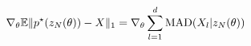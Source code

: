 \documentclass[preview]{standalone}
\begin{document}
\begin{align*}
\special{dvisvgm:raw <g id='unique000'>}\nabla_{\theta} \mathbb{E}\|p^\star(z_N(\theta)) - X\|_1 = \nabla_{\theta} \sum_{l=1}^d \text{MAD}(X_l | z_N(\theta))\special{dvisvgm:raw </g>}
\end{align*}
\end{document}
